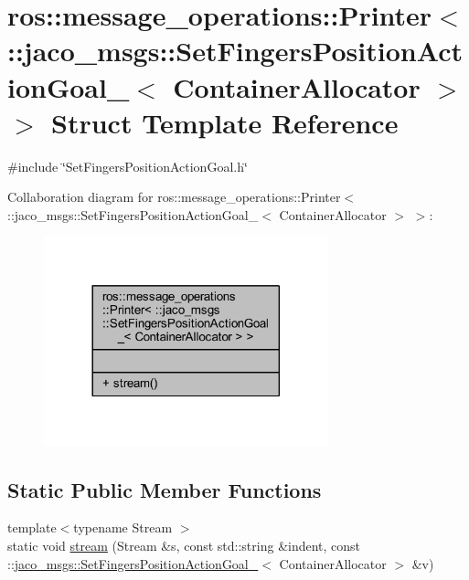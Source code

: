 \hypertarget{structros_1_1message__operations_1_1Printer_3_01_1_1jaco__msgs_1_1SetFingersPositionActionGoal__33ea544897d72e7b50aaaf79efc6fd71}{}\section{ros\+:\+:message\+\_\+operations\+:\+:Printer$<$ \+:\+:jaco\+\_\+msgs\+:\+:Set\+Fingers\+Position\+Action\+Goal\+\_\+$<$ Container\+Allocator $>$ $>$ Struct Template Reference}
\label{structros_1_1message__operations_1_1Printer_3_01_1_1jaco__msgs_1_1SetFingersPositionActionGoal__33ea544897d72e7b50aaaf79efc6fd71}


{\ttfamily \#include \char`\"{}Set\+Fingers\+Position\+Action\+Goal.\+h\char`\"{}}



Collaboration diagram for ros\+:\+:message\+\_\+operations\+:\+:Printer$<$ \+:\+:jaco\+\_\+msgs\+:\+:Set\+Fingers\+Position\+Action\+Goal\+\_\+$<$ Container\+Allocator $>$ $>$\+:
\nopagebreak
\begin{figure}[H]
\begin{center}
\leavevmode
\includegraphics[width=233pt]{d2/dee/structros_1_1message__operations_1_1Printer_3_01_1_1jaco__msgs_1_1SetFingersPositionActionGoal__15430a4ed18788fa6b45baa5769b7709}
\end{center}
\end{figure}
\subsection*{Static Public Member Functions}
\begin{DoxyCompactItemize}
\item 
{\footnotesize template$<$typename Stream $>$ }\\static void \hyperlink{structros_1_1message__operations_1_1Printer_3_01_1_1jaco__msgs_1_1SetFingersPositionActionGoal__33ea544897d72e7b50aaaf79efc6fd71_a403e89758ee1b13c990abfd8bbb2ff9e}{stream} (Stream \&s, const std\+::string \&indent, const \+::\hyperlink{structjaco__msgs_1_1SetFingersPositionActionGoal__}{jaco\+\_\+msgs\+::\+Set\+Fingers\+Position\+Action\+Goal\+\_\+}$<$ Container\+Allocator $>$ \&v)
\end{DoxyCompactItemize}


